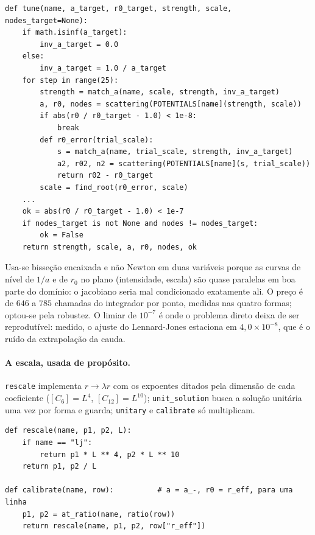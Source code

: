 \documentclass[11pt,a4paper]{article}
\newcommand{\cod}[1]{\texttt{\small #1}}
\begin{document}
\begin{lstlisting}[caption={\cod{lab.py} --- o limiar é \emph{relativo}: a mesma
rotina é chamada para $r_0=1$ e para $r_0=136\,a_0$, e um limiar absoluto seria
duas exigências diferentes. \cod{nodes\_target} não é opcional: duas soluções
podem compartilhar $(a,r_0)$ e diferir em número de nós, e então não são o
mesmo estado físico.}]
def tune(name, a_target, r0_target, strength, scale, nodes_target=None):
    if math.isinf(a_target):
        inv_a_target = 0.0
    else:
        inv_a_target = 1.0 / a_target
    for step in range(25):
        strength = match_a(name, scale, strength, inv_a_target)
        a, r0, nodes = scattering(POTENTIALS[name](strength, scale))
        if abs(r0 / r0_target - 1.0) < 1e-8:
            break
        def r0_error(trial_scale):
            s = match_a(name, trial_scale, strength, inv_a_target)
            a2, r02, n2 = scattering(POTENTIALS[name](s, trial_scale))
            return r02 - r0_target
        scale = find_root(r0_error, scale)
    ...
    ok = abs(r0 / r0_target - 1.0) < 1e-7
    if nodes_target is not None and nodes != nodes_target:
        ok = False
    return strength, scale, a, r0, nodes, ok
\end{lstlisting}

Usa-se bisseção encaixada e não Newton em duas variáveis porque as curvas de
nível de $1/a$ e de $r_0$ no plano (intensidade, escala) são quase paralelas em
boa parte do domínio: o jacobiano seria mal condicionado exatamente ali. O
preço é de $646$ a $785$ chamadas do integrador por ponto, medidas nas quatro
formas; optou-se pela robustez. O limiar de $10^{-7}$ é onde o problema direto
deixa de ser reprodutível: medido, o ajuste do Lennard-Jones estaciona em
$4{,}0\times10^{-8}$, que é o ruído da extrapolação da cauda.

\paragraph{A escala, usada de propósito.} \cod{rescale} implementa
$r\to\lambda r$ com os expoentes ditados pela dimensão de cada coeficiente
($[C_6]=L^4$, $[C_{12}]=L^{10}$); \cod{unit\_solution} busca a solução unitária
uma vez por forma e guarda; \cod{unitary} e \cod{calibrate} só multiplicam.

\begin{lstlisting}[caption={\cod{etrych.py} --- a economia não é cosmética.
Ajustado direto em $r_\mathrm{eff}=136\,a_0$ o Lennard-Jones leva $144$~s e
\emph{falha} em três das cinco linhas, porque o chute inicial carrega $L^{10}$;
ajustado em $r_0=1$ e reescalado leva $1{,}4$~s.}]
def rescale(name, p1, p2, L):
    if name == "lj":
        return p1 * L ** 4, p2 * L ** 10
    return p1, p2 / L

def calibrate(name, row):          # a = a_-, r0 = r_eff, para uma linha
    p1, p2 = at_ratio(name, ratio(row))
    return rescale(name, p1, p2, row["r_eff"])
\end{lstlisting}
\end{document}
